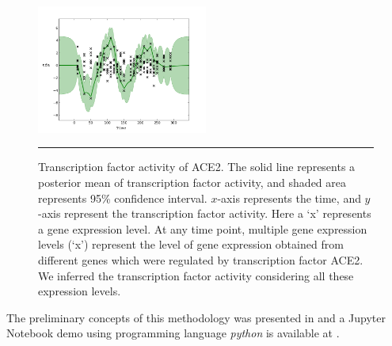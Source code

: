 \begin{figure}[!htbp]
	\centering
	\includegraphics[width=0.5\textwidth,keepaspectratio]{diagrams/ACE2_OU_Wh_9TF.png}
	\rule{25em}{0.5pt}
	\caption[Inference of transcription factor activity of ACE2]
	{Transcription factor activity of ACE2. The solid line represents a posterior mean of transcription factor activity, and shaded area represents 95\% confidence interval. $x$-axis represents the time, and $y$-axis represent the transcription factor activity. Here a \lq x\rq{ }represents a gene expression level. At any time point, multiple gene expression levels (\lq x\rq) represent the level of gene expression obtained from different genes which were regulated by transcription factor ACE2. We inferred the transcription factor activity considering all these expression levels.}
	\label{fig:TFA_of_of_ACE2}
\end{figure}


 The preliminary concepts of this methodology was presented in \cite{Rahman:2016} and a Jupyter Notebook demo using programming language \emph{python} is available at \cite{Muhammad:2014}.

